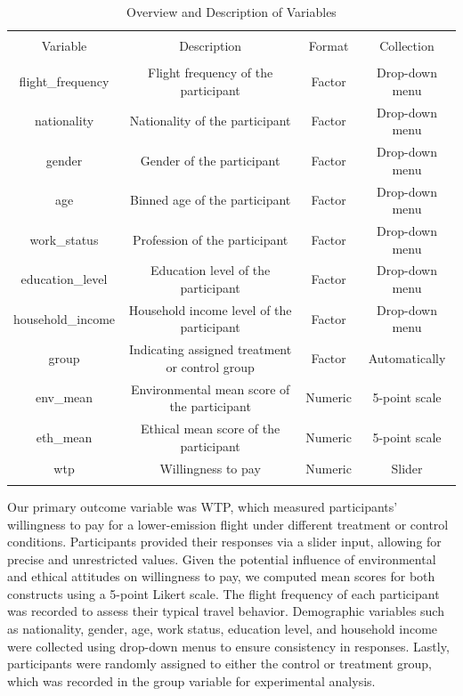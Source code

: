 \documentclass[
]{article}
\begin{document}
\begin{table}[!htbp] \centering 
  \caption{Overview and Description of Variables} 
  \label{} 
\begin{tabular}{@{\extracolsep{5pt}} cccc} 
\\[-1.8ex]\hline 
\hline \\[-1.8ex] 
Variable & Description & Format & Collection \\ 
\hline \\[-1.8ex] 
flight\_frequency & Flight frequency of the participant & Factor & Drop-down menu \\ 
nationality & Nationality of the participant & Factor & Drop-down menu \\ 
gender & Gender of the participant & Factor & Drop-down menu \\ 
age & Binned age of the participant & Factor & Drop-down menu \\ 
work\_status & Profession of the participant & Factor & Drop-down menu \\ 
education\_level & Education level of the participant & Factor & Drop-down menu \\ 
household\_income & Household income level of the participant & Factor & Drop-down menu \\ 
group & Indicating assigned treatment or control group & Factor & Automatically \\ 
env\_mean & Environmental mean score of the participant & Numeric & 5-point scale \\ 
eth\_mean & Ethical mean score of the participant & Numeric & 5-point scale \\ 
wtp & Willingness to pay & Numeric & Slider \\ 
\hline \\[-1.8ex] 
\end{tabular} 
\end{table}

Our primary outcome variable was WTP, which measured participants'
willingness to pay for a lower-emission flight under different treatment
or control conditions. Participants provided their responses via a
slider input, allowing for precise and unrestricted values. Given the
potential influence of environmental and ethical attitudes on
willingness to pay, we computed mean scores for both constructs using a
5-point Likert scale. The flight frequency of each participant was
recorded to assess their typical travel behavior. Demographic variables
such as nationality, gender, age, work status, education level, and
household income were collected using drop-down menus to ensure
consistency in responses. Lastly, participants were randomly assigned to
either the control or treatment group, which was recorded in the group
variable for experimental analysis.
\end{document}
